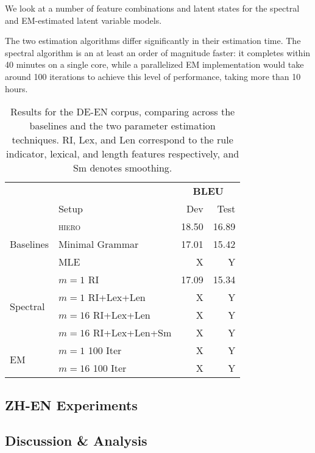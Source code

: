 \documentclass[11pt]{article}
\begin{document}
We look at a number of feature combinations and latent states for the spectral and EM-estimated latent variable models.  

The two estimation algorithms differ significantly in their estimation time.  
The spectral algorithm is an at least an order of magnitude faster: it completes within 40 minutes on a single core, while a parallelized EM implementation would take around 100 iterations to achieve this level of performance, taking more than 10 hours.  

\begin{table}[t!]
\begin{small}
  \begin{center}
    \begin{tabular}{|l|p{}rr|}
      \hline
	  & & \multicolumn{2}{c|}{\bf BLEU} \\
      & Setup & Dev & Test \\
	  \hline
	  \multirow{3}{*}{Baselines} & \textsc{hiero} & 18.50 & 16.89 \\
      & Minimal Grammar & 17.01 & 15.42 \\
	  & MLE & X & Y \\ \hline
	  \multirow{4}{*}{Spectral} &  $m=1$ RI & 17.09 & 15.34 \\
	  & $m=1$ RI+Lex+Len & X & Y \\
	  & $m=16$ RI+Lex+Len & X & Y \\
	  & $m=16$ RI+Lex+Len+Sm & X & Y \\ \hline
	  \multirow{2}{*}{EM} & $m=1$ 100 Iter & X & Y \\
	  & $m=16$ 100 Iter & X & Y \\
	  \hline
	\end{tabular}
  \end{center}
  \caption{Results for the \textsc{DE-EN} corpus, comparing across the baselines and the two parameter estimation techniques.
  RI, Lex, and Len correspond to the rule indicator, lexical, and length features respectively, and Sm denotes smoothing.}
  \label{tab:de-en-results}
\end{small}
\end{table}
\subsection{\textsc{ZH-EN} Experiments}

\subsection{Discussion \& Analysis}
\end{document}
